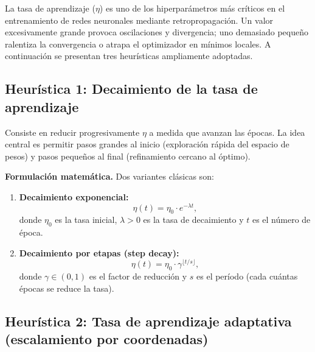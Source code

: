 
La tasa de aprendizaje ($\eta$) es uno de los hiperparámetros más críticos en el entrenamiento de redes neuronales mediante retropropagación. Un valor excesivamente grande provoca oscilaciones y divergencia; uno demasiado pequeño ralentiza la convergencia o atrapa el optimizador en mínimos locales. A continuación se presentan tres heurísticas ampliamente adoptadas.

\subsection{Heurística 1: Decaimiento de la tasa de aprendizaje}

Consiste en reducir progresivamente $\eta$ a medida que avanzan las épocas. La idea central es permitir pasos grandes al inicio (exploración rápida del espacio de pesos) y pasos pequeños al final (refinamiento cercano al óptimo).

\textbf{Formulación matemática.} Dos variantes clásicas son:

\begin{enumerate}[label=\arabic*.]
    \item \textbf{Decaimiento exponencial:}
    \begin{equation}
        \eta(t) = \eta_0 \cdot e^{-\lambda t},
    \end{equation}
    donde $\eta_0$ es la tasa inicial, $\lambda > 0$ es la tasa de decaimiento y $t$ es el número de época.

    \item \textbf{Decaimiento por etapas (step decay):}
    \begin{equation}
        \eta(t) = \eta_0 \cdot \gamma^{\lfloor t / s \rfloor},
    \end{equation}
    donde $\gamma \in (0,1)$ es el factor de reducción y $s$ es el período (cada cuántas épocas se reduce la tasa).
\end{enumerate}

\subsection{Heurística 2: Tasa de aprendizaje adaptativa (escalamiento por coordenadas)}

